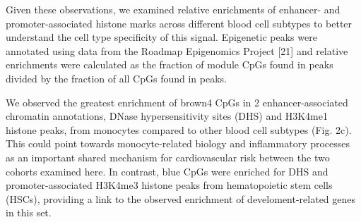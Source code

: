 \documentclass[]{article}
\theoremstyle{definition}
\theoremstyle{definition}
\theoremstyle{definition}
\theoremstyle{remark}
\begin{document}
Given these observations, we examined relative enrichments of enhancer-
and promoter-associated histone marks across different blood cell
subtypes to better understand the cell type specificity of this signal.
Epigenetic peaks were annotated using data from the Roadmap Epigenomics
Project {[}21{]} and relative enrichments were calculated as the
fraction of module CpGs found in peaks divided by the fraction of all
CpGs found in peaks.

We observed the greatest enrichment of brown4 CpGs in 2
enhancer-associated chromatin annotations, DNase hypersensitivity sites
(DHS) and H3K4me1 histone peaks, from monocytes compared to other blood
cell subtypes (Fig. 2c). This could point towards monocyte-related
biology and inflammatory processes as an important shared mechanism for
cardiovascular risk between the two cohorts examined here. In contrast,
blue CpGs were enriched for DHS and promoter-associated H3K4me3 histone
peaks from hematopoietic stem cells (HSCs), providing a link to the
observed enrichment of develoment-related genes in this set.
\end{document}

